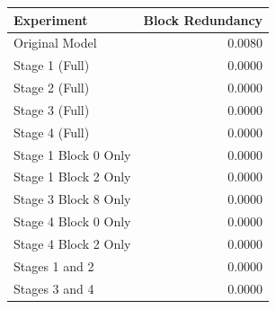 \begin{tabular}{lr}
\toprule
Experiment & Block Redundancy \\
\midrule
Original Model & 0.0080 \\
Stage 1 (Full) & 0.0000 \\
Stage 2 (Full) & 0.0000 \\
Stage 3 (Full) & 0.0000 \\
Stage 4 (Full) & 0.0000 \\
Stage 1 Block 0 Only & 0.0000 \\
Stage 1 Block 2 Only & 0.0000 \\
Stage 3 Block 8 Only & 0.0000 \\
Stage 4 Block 0 Only & 0.0000 \\
Stage 4 Block 2 Only & 0.0000 \\
Stages 1 and 2 & 0.0000 \\
Stages 3 and 4 & 0.0000 \\
\bottomrule
\end{tabular}
